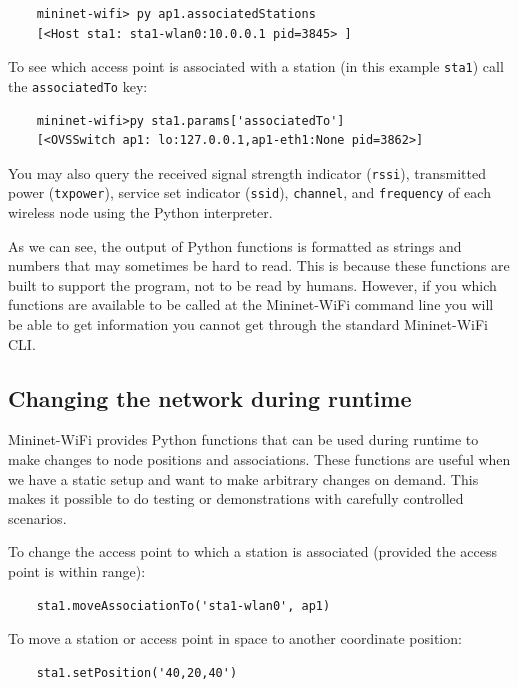 \begin{verbatim}
    mininet-wifi> py ap1.associatedStations
    [<Host sta1: sta1-wlan0:10.0.0.1 pid=3845> ]
\end{verbatim}
   
\noindent To see which access point is associated with a station (in this example \texttt{sta1}) call the \texttt{associatedTo} key:

\begin{verbatim}
    mininet-wifi>py sta1.params['associatedTo']
    [<OVSSwitch ap1: lo:127.0.0.1,ap1-eth1:None pid=3862>]
\end{verbatim}
        

\noindent You may also query the received signal strength indicator (\texttt{rssi}), transmitted power (\texttt{txpower}), service set indicator (\texttt{ssid}), \texttt{channel}, and \texttt{frequency} of each wireless node using the Python interpreter.

\noindent As we can see, the output of Python functions is formatted as strings and numbers that may sometimes be hard to read. This is because these functions are built to support the program, not to be read by humans. However, if you which functions are available to be called at the Mininet-WiFi command line you will be able to get information you cannot get through the standard Mininet-WiFi CLI.

\subsection{Changing the network during runtime}

Mininet-WiFi provides Python functions that can be used during runtime to make changes to node positions and associations. These functions are useful when we have a static setup and want to make arbitrary changes on demand. This makes it possible to do testing or demonstrations with carefully controlled scenarios.

To change the access point to which a station is associated (provided the access point is within range):

\begin{verbatim}
    sta1.moveAssociationTo('sta1-wlan0', ap1) 
\end{verbatim}
    

\noindent To move a station or access point in space to another coordinate position:

\begin{verbatim}
    sta1.setPosition('40,20,40')
\end{verbatim}
    
